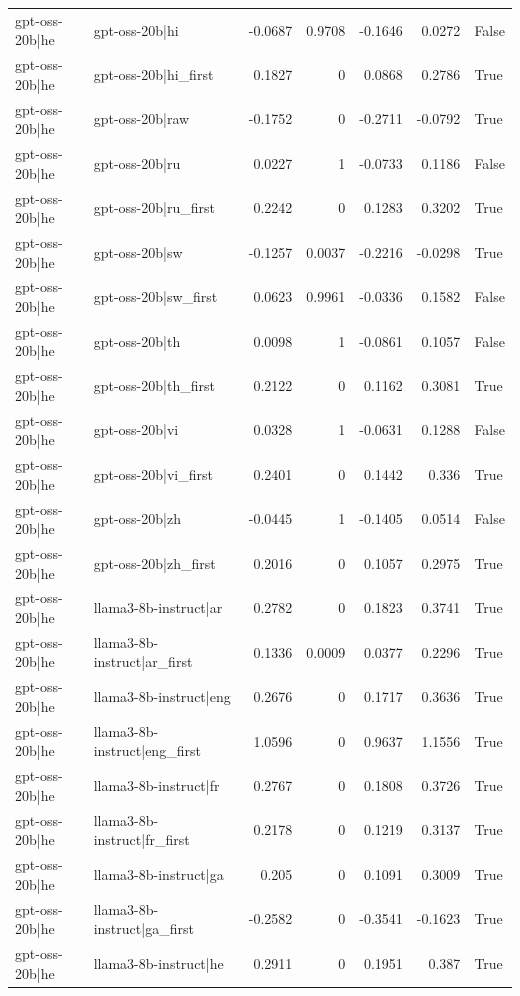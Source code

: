 \begin{table}
\begin{tabular}{l l r r r r l}
gpt-oss-20b|he & gpt-oss-20b|hi & -0.0687 & 0.9708 & -0.1646 & 0.0272 & False \\
gpt-oss-20b|he & gpt-oss-20b|hi_first & 0.1827 & 0 & 0.0868 & 0.2786 & True \\
gpt-oss-20b|he & gpt-oss-20b|raw & -0.1752 & 0 & -0.2711 & -0.0792 & True \\
gpt-oss-20b|he & gpt-oss-20b|ru & 0.0227 & 1 & -0.0733 & 0.1186 & False \\
gpt-oss-20b|he & gpt-oss-20b|ru_first & 0.2242 & 0 & 0.1283 & 0.3202 & True \\
gpt-oss-20b|he & gpt-oss-20b|sw & -0.1257 & 0.0037 & -0.2216 & -0.0298 & True \\
gpt-oss-20b|he & gpt-oss-20b|sw_first & 0.0623 & 0.9961 & -0.0336 & 0.1582 & False \\
gpt-oss-20b|he & gpt-oss-20b|th & 0.0098 & 1 & -0.0861 & 0.1057 & False \\
gpt-oss-20b|he & gpt-oss-20b|th_first & 0.2122 & 0 & 0.1162 & 0.3081 & True \\
gpt-oss-20b|he & gpt-oss-20b|vi & 0.0328 & 1 & -0.0631 & 0.1288 & False \\
gpt-oss-20b|he & gpt-oss-20b|vi_first & 0.2401 & 0 & 0.1442 & 0.336 & True \\
gpt-oss-20b|he & gpt-oss-20b|zh & -0.0445 & 1 & -0.1405 & 0.0514 & False \\
gpt-oss-20b|he & gpt-oss-20b|zh_first & 0.2016 & 0 & 0.1057 & 0.2975 & True \\
gpt-oss-20b|he & llama3-8b-instruct|ar & 0.2782 & 0 & 0.1823 & 0.3741 & True \\
gpt-oss-20b|he & llama3-8b-instruct|ar_first & 0.1336 & 0.0009 & 0.0377 & 0.2296 & True \\
gpt-oss-20b|he & llama3-8b-instruct|eng & 0.2676 & 0 & 0.1717 & 0.3636 & True \\
gpt-oss-20b|he & llama3-8b-instruct|eng_first & 1.0596 & 0 & 0.9637 & 1.1556 & True \\
gpt-oss-20b|he & llama3-8b-instruct|fr & 0.2767 & 0 & 0.1808 & 0.3726 & True \\
gpt-oss-20b|he & llama3-8b-instruct|fr_first & 0.2178 & 0 & 0.1219 & 0.3137 & True \\
gpt-oss-20b|he & llama3-8b-instruct|ga & 0.205 & 0 & 0.1091 & 0.3009 & True \\
gpt-oss-20b|he & llama3-8b-instruct|ga_first & -0.2582 & 0 & -0.3541 & -0.1623 & True \\
gpt-oss-20b|he & llama3-8b-instruct|he & 0.2911 & 0 & 0.1951 & 0.387 & True \\

\end{tabular}
\end{table}
